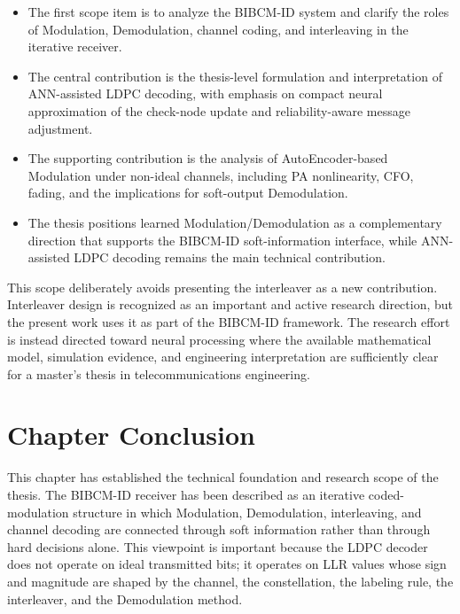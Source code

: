 \begin{itemize}
\item The first scope item is to analyze the BIBCM-ID system and clarify the roles of Modulation, Demodulation, channel coding, and interleaving in the iterative receiver.
\end{itemize}
\begin{itemize}
\item The central contribution is the thesis-level formulation and interpretation of ANN-assisted LDPC decoding, with emphasis on compact neural approximation of the check-node update and reliability-aware message adjustment.
\end{itemize}
\begin{itemize}
\item The supporting contribution is the analysis of AutoEncoder-based Modulation under non-ideal channels, including PA nonlinearity, CFO, fading, and the implications for soft-output Demodulation.
\end{itemize}
\begin{itemize}
\item The thesis positions learned Modulation/Demodulation as a complementary direction that supports the BIBCM-ID soft-information interface, while ANN-assisted LDPC decoding remains the main technical contribution.
\end{itemize}

This scope deliberately avoids presenting the interleaver as a new contribution. Interleaver design is recognized as an important and active research direction, but the present work uses it as part of the BIBCM-ID framework. The research effort is instead directed toward neural processing where the available mathematical model, simulation evidence, and engineering interpretation are sufficiently clear for a master's thesis in telecommunications engineering.

\section{Chapter Conclusion}
This chapter has established the technical foundation and research scope of the thesis. The BIBCM-ID receiver has been described as an iterative coded-modulation structure in which Modulation, Demodulation, interleaving, and channel decoding are connected through soft information rather than through hard decisions alone. This viewpoint is important because the LDPC decoder does not operate on ideal transmitted bits; it operates on LLR values whose sign and magnitude are shaped by the channel, the constellation, the labeling rule, the interleaver, and the Demodulation method.

